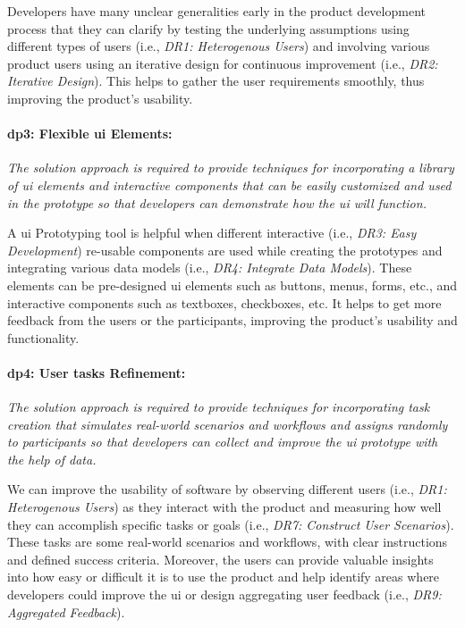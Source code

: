 Developers have many unclear generalities early in the product development process \cite{misc:lean:steve} that they can clarify by testing the underlying assumptions using different types of users (i.e., \textit{DR1: Heterogenous Users}) and involving various product users using an iterative design for continuous improvement (i.e., \textit{DR2: Iterative Design}).
This helps to gather the user requirements smoothly, thus improving the product's usability.

\paragraph{\ac{dp}3: Flexible \ac{ui} Elements:} \textit{The solution approach is required to provide techniques for incorporating a library of \ac{ui} elements and interactive components that can be easily customized and used in the prototype so that developers can demonstrate how the \ac{ui} will function.}

A \ac{ui} Prototyping tool is helpful when different interactive (i.e., \textit{DR3: Easy Development}) re-usable components are used while creating the prototypes and integrating various data models (i.e., \textit{DR4: Integrate Data Models}).
These elements can be pre-designed \ac{ui} elements such as buttons, menus, forms, etc., and interactive components such as textboxes, checkboxes, etc.
It helps to get more feedback from the users or the participants, improving the product's usability and functionality.

\paragraph{\ac{dp}4: User tasks Refinement:} \textit{The solution approach is required to provide techniques for incorporating task creation that simulates real-world scenarios and workflows and assigns randomly to participants so that developers can collect and improve the \ac{ui} prototype with the help of data.}

We can improve the usability of software by observing different users (i.e., \textit{DR1: Heterogenous Users}) as they interact with the product and measuring how well they can accomplish specific tasks or goals (i.e., \textit{DR7: Construct User Scenarios}).
These tasks are some real-world scenarios and workflows, with clear instructions and defined success criteria.
Moreover, the users can provide valuable insights into how easy or difficult it is to use the product and help identify areas where developers could improve the \ac{ui} or design aggregating user feedback (i.e., \textit{DR9: Aggregated Feedback}).


